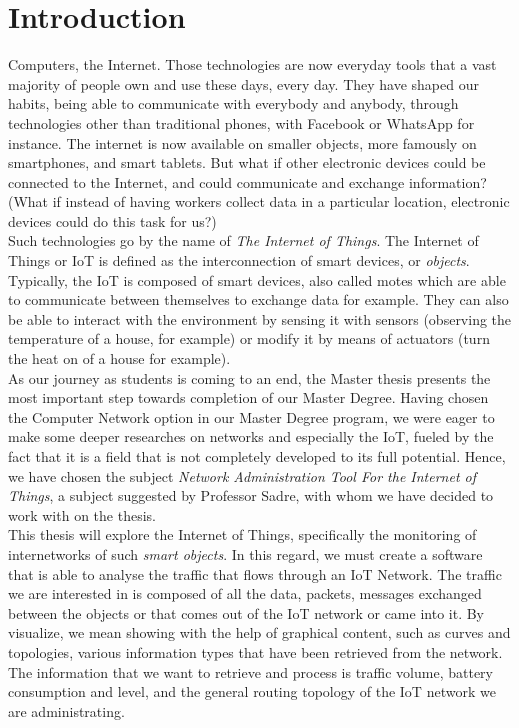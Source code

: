 \chapter*{Introduction}

Computers, the Internet. Those technologies are now everyday tools that a vast majority of people own and use these days, every day. They have shaped our habits, being able to communicate with everybody and anybody, through technologies other than traditional phones, with Facebook or WhatsApp for instance. The internet is now available on smaller objects, more famously on smartphones, and smart tablets. But what if other electronic devices could be connected to the Internet, and could communicate and exchange information? (What if instead of having workers collect data in a particular location, electronic devices could do this task for us?)\\

Such technologies go by the name of \textit{The Internet of Things}. The Internet of Things or IoT is defined as the interconnection of smart devices, or \textit{objects}. Typically, the IoT is composed of smart devices, also called motes which are able to communicate between themselves to exchange data for example. They can also be able to interact with the environment by sensing it with sensors (observing the temperature of a house, for example) or modify it by means of actuators (turn the heat on of a house for example).\\

As our journey as students is coming to an end, the Master thesis presents the most important step towards completion of our Master Degree.  Having chosen the Computer Network option in our Master Degree program, we were eager to make some deeper researches on networks and especially the IoT, fueled by the fact that it is a field that is not completely developed to its full potential. Hence, we have chosen the subject \textit{Network Administration Tool For the Internet of Things}, a subject suggested by Professor Sadre, with whom we have decided to work with on the thesis. \\

This thesis will explore the Internet of Things, specifically the monitoring of internetworks of such \textit{smart objects}.  In this regard, we must create a software that is able to analyse the traffic that flows through an IoT Network. The traffic we are interested in is composed of all the data, packets, messages exchanged between the objects or that comes out of the IoT network or came into it. By visualize, we mean showing with the help of graphical content, such as curves and topologies, various information types that have been retrieved from the network. The information that we want to retrieve and process is traffic volume, battery consumption and level, and the general routing topology of the IoT network we are administrating.

